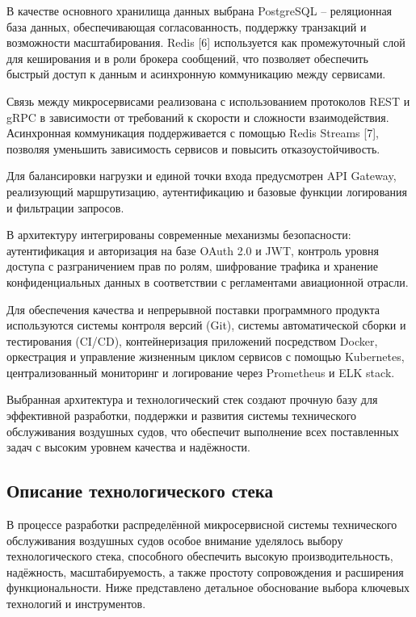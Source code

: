 \documentclass[14pt,a4paper]{extarticle}
\begin{document}
В качестве основного хранилища данных выбрана PostgreSQL – реляционная база данных, обеспечивающая согласованность, поддержку транзакций и возможности масштабирования. Redis [6] используется как промежуточный слой для кеширования и в роли брокера сообщений, что позволяет обеспечить быстрый доступ к данным и асинхронную коммуникацию между сервисами.

Связь между микросервисами реализована с использованием протоколов REST и gRPC в зависимости от требований к скорости и сложности взаимодействия. Асинхронная коммуникация поддерживается с помощью Redis Streams [7], позволяя уменьшить зависимость сервисов и повысить отказоустойчивость.

Для балансировки нагрузки и единой точки входа предусмотрен API Gateway, реализующий маршрутизацию, аутентификацию и базовые функции логирования и фильтрации запросов.

В архитектуру интегрированы современные механизмы безопасности: аутентификация и авторизация на базе OAuth 2.0 и JWT, контроль уровня доступа с разграничением прав по ролям, шифрование трафика и хранение конфиденциальных данных в соответствии с регламентами авиационной отрасли.

Для обеспечения качества и непрерывной поставки программного продукта используются системы контроля версий (Git), системы автоматической сборки и тестирования (CI/CD), контейнеризация приложений посредством Docker, оркестрация и управление жизненным циклом сервисов с помощью Kubernetes, централизованный мониторинг и логирование через Prometheus и ELK stack.

Выбранная архитектура и технологический стек создают прочную базу для эффективной разработки, поддержки и развития системы технического обслуживания воздушных судов, что обеспечит выполнение всех поставленных задач с высоким уровнем качества и надёжности.

\subsection{Описание технологического стека}

В процессе разработки распределённой микросервисной системы технического обслуживания воздушных судов особое внимание уделялось выбору технологического стека, способного обеспечить высокую производительность, надёжность, масштабируемость, а также простоту сопровождения и расширения функциональности. Ниже представлено детальное обоснование выбора ключевых технологий и инструментов.
\end{document}
